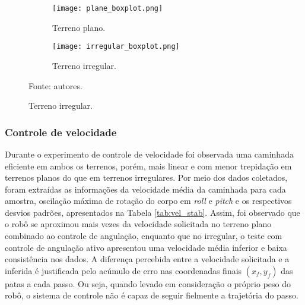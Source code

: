 \documentclass[../main.tex]{subfiles}
\begin{document}
  \begin{figure}[!htb]
    \centering
    \caption{Oscilação do corpo em ambos os tipos de terreno.}
    \begin{subfigure}[t]{0.49\textwidth}
      \centering
      \texttt{[image: plane\_boxplot.png]}
      \caption{Terreno plano.}
      \label{fig:imu_test_plane}
    \end{subfigure}
    \begin{subfigure}[t]{0.49\textwidth}
      \centering
      \texttt{[image: irregular\_boxplot.png]}
      \caption{Terreno irregular.}
      \label{fig:imu_test_irregular}
    \end{subfigure}
    
    Fonte: autores.
    \label{fig:imu_test}
  \end{figure}

  \subsubsection{Controle de velocidade}
  Durante o experimento de controle de velocidade foi observada uma caminhada eficiente em ambos os terrenos, porém, mais linear e com menor trepidação em terrenos planos do que em terrenos irregulares. Por meio dos dados coletados, foram extraídas as informações da velocidade média da caminhada para cada amostra, oscilação máxima de rotação do corpo em \textit{roll} e \textit{pitch} e os respectivos desvios padrões, apresentados na Tabela \ref{tab:vel_stab}. Assim, foi observado que o robô se aproximou mais vezes da velocidade solicitada no terreno plano combinado ao controle de angulação, enquanto que no irregular, o teste com controle de angulação ativo apresentou uma velocidade média inferior e baixa consistência nos dados. A diferença percebida entre a velocidade solicitada e a inferida é justificada pelo acúmulo de erro nas coordenadas finais $(x_f, y_f)$ das patas a cada passo. Ou seja, quando levado em consideração o próprio peso do robô, o sistema de controle não é capaz de seguir fielmente a trajetória do passo.
\end{document}
